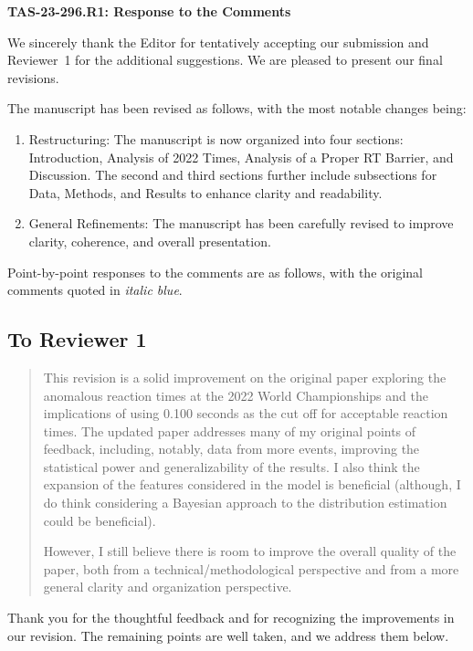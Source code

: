 \documentclass[12pt]{article}
\newenvironment{comment}%
{\begin{quotation}\noindent\small\it\color{darkblue}\ignorespaces%
}{\end{quotation}}
\begin{document}
\begin{center}
  {\Large\bf TAS-23-296.R1: Response to the Comments}
\end{center}

We sincerely thank the Editor for tentatively accepting our submission
and Reviewer~1 for the additional suggestions. We are pleased to
present our final revisions.


The manuscript has been revised as follows, with the most notable
changes being:
\begin{enumerate}
\item
  Restructuring: The manuscript is now organized into four
  sections: Introduction, Analysis of 2022 Times, Analysis of a Proper
  RT Barrier, and Discussion. The second and third sections
  further include subsections for Data, Methods, and Results to
  enhance clarity and readability.
\item
  General Refinements: The manuscript has been carefully revised to
  improve clarity, coherence, and overall presentation.
\end{enumerate}

Point-by-point responses to the comments are as follows, with the
original comments quoted in \emph{\color{darkblue} italic blue}.


\subsection*{To Reviewer 1}

\begin{comment}
This revision is a solid improvement on the original paper exploring the
anomalous reaction times at the 2022 World Championships and the implications of
using 0.100 seconds as the cut off for acceptable reaction times. The updated
paper addresses many of my original points of feedback, including, notably, data
from more events, improving the statistical power and generalizability of the
results. I also think the expansion of the features considered in the model is
beneficial (although, I do think considering a Bayesian approach to the
distribution estimation could be beneficial).

However, I still believe there is room to improve the overall quality of the
paper, both from a technical/methodological perspective and from a more general
clarity and organization perspective.


\end{comment}

Thank you for the thoughtful feedback and for recognizing the
improvements in our revision. The remaining points are well taken, and
we address them below.
\end{document}
